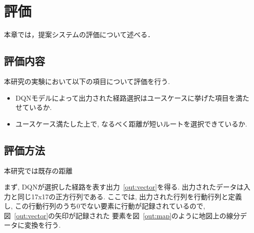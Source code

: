 \chapter{評価}
\label{evaluation}

本章では，提案システムの評価について述べる．


\section{評価内容}

本研究の実験において以下の項目について評価を行う.


\begin{itemize}
    \item DQNモデルによって出力された経路選択はユースケースに挙げた項目を満たせているか.
    \item ユースケース満たした上で, なるべく距離が短いルートを選択できているか.
\end{itemize}


\section{評価方法}

本研究では既存の距離

まず, DQNが選択した経路を表す出力~\ref{out:vector}を得る. 出力されたデータは入力と同じ17x17の正方行列である.
ここでは, 出力された行列を行動行列と定義し, この行動行列のうち0でない要素に行動が記録されているので, 図~\ref{out:vector}の矢印が記録された
要素を図~\ref{out:map}のように地図上の線分データに変換を行う.

